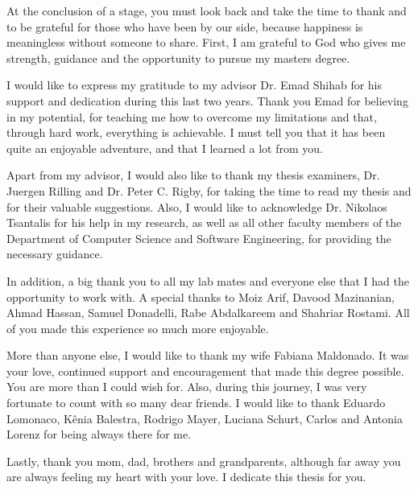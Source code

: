 \documentclass[12pt]{report}
\begin{document}
\begin{acknowledgments}
At the conclusion of a stage, you must look back and take the time to thank and to be grateful for those who have been by our side, because happiness is meaningless without someone to share. First, I am grateful to God who gives me strength, guidance and the opportunity to pursue my masters degree. 

I would like to express my gratitude to my advisor Dr. Emad Shihab for his support and dedication during this last two years. Thank you Emad for believing in my potential, for teaching me how to overcome my limitations and that, through hard work, everything is achievable. I must tell you that it has been quite an enjoyable adventure, and that I learned a lot from you. 

Apart from my advisor, I would also like to thank my thesis examiners, Dr. Juergen Rilling and Dr. Peter C. Rigby, for taking the time to read my thesis and for their valuable suggestions. Also, I would like to acknowledge Dr. Nikolaos Tsantalis for his help in my research, as well as all other faculty members of the Department of Computer Science and Software Engineering, for providing the necessary guidance.

In addition, a big thank you to all my lab mates and everyone else that I had the opportunity to work with. A special thanks to Moiz Arif, Davood Mazinanian, Ahmad Hassan, Samuel Donadelli, Rabe Abdalkareem and Shahriar Rostami. All of you made this experience so much more enjoyable. 

More than anyone else, I would like to thank my wife Fabiana Maldonado. It was your love, continued support and encouragement that made this degree possible. You are more than I could wish for. Also, during this journey, I was very fortunate to count with so many dear friends. I would like to thank Eduardo Lomonaco, K\^{e}nia Balestra, Rodrigo Mayer, Luciana Schurt, Carlos and Antonia Lorenz for being always there for me. 

Lastly, thank you mom, dad, brothers and grandparents, although far away you are always feeling my heart with your love. I dedicate this thesis for you.

\end{acknowledgments}
\end{document}
